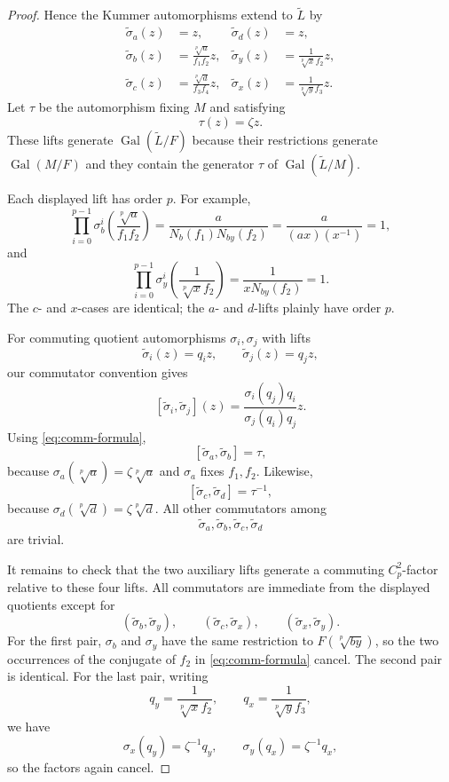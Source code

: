 \documentclass[12pt]{amsart}
\theoremstyle{definition}
\theoremstyle{remark}
\DeclareMathOperator{\Gal}{Gal}
\begin{document}
\begin{proof}
Hence the Kummer automorphisms extend to $\widetilde L$ by
\begin{align*}
 \widetilde\sigma_a(z)&=z,
 &\widetilde\sigma_d(z)&=z,\\
 \widetilde\sigma_b(z)&=\frac{\sqrt[p]{a}}{f_1f_2}z,
 &\widetilde\sigma_y(z)&=\frac{1}{\sqrt[p]{x}f_2}z,\\
 \widetilde\sigma_c(z)&=\frac{\sqrt[p]{d}}{f_3f_4}z,
 &\widetilde\sigma_x(z)&=\frac{1}{\sqrt[p]{y}f_3}z.
\end{align*}
Let $\tau$ be the automorphism fixing $M$ and satisfying
\[
 \tau(z)=\zeta z.
\]
These lifts generate $\Gal(\widetilde L/F)$ because their restrictions
generate $\Gal(M/F)$ and they contain the generator $\tau$ of
$\Gal(\widetilde L/M)$.

Each displayed lift has order $p$. For example,
\[
 \prod_{i=0}^{p-1}\sigma_b^i
 \left(\frac{\sqrt[p]{a}}{f_1f_2}\right)
 =\frac{a}{N_b(f_1)N_{by}(f_2)}
 =\frac{a}{(ax)(x^{-1})}=1,
\]
and
\[
 \prod_{i=0}^{p-1}\sigma_y^i
 \left(\frac{1}{\sqrt[p]{x}f_2}\right)
 =\frac{1}{xN_{by}(f_2)}=1.
\]
The $c$- and $x$-cases are identical; the $a$- and $d$-lifts plainly have
order $p$.

For commuting quotient automorphisms $\sigma_i,\sigma_j$ with lifts
\[
 \widetilde\sigma_i(z)=q_i z,
 \qquad
 \widetilde\sigma_j(z)=q_j z,
\]
our commutator convention gives
\begin{equation}\label{eq:comm-formula}
 [\widetilde\sigma_i,\widetilde\sigma_j](z)
 =\frac{\sigma_i(q_j)q_i}{\sigma_j(q_i)q_j}z.
\end{equation}
Using \eqref{eq:comm-formula},
\[
 [\widetilde\sigma_a,\widetilde\sigma_b]=\tau,
\]
because $\sigma_a(\sqrt[p]{a})=\zeta\sqrt[p]{a}$ and $\sigma_a$ fixes
$f_1,f_2$. Likewise,
\[
 [\widetilde\sigma_c,\widetilde\sigma_d]=\tau^{-1},
\]
because $\sigma_d(\sqrt[p]{d})=\zeta\sqrt[p]{d}$.
All other commutators among
\[
 \widetilde\sigma_a,\widetilde\sigma_b,
 \widetilde\sigma_c,\widetilde\sigma_d
\]
are trivial.

It remains to check that the two auxiliary lifts generate a commuting
$C_p^2$-factor relative to these four lifts. All commutators are immediate
from the displayed quotients except for
\[
 (\widetilde\sigma_b,\widetilde\sigma_y),\qquad
 (\widetilde\sigma_c,\widetilde\sigma_x),\qquad
 (\widetilde\sigma_x,\widetilde\sigma_y).
\]
For the first pair, $\sigma_b$ and $\sigma_y$ have the same restriction to
$F(\sqrt[p]{by})$, so the two occurrences of the conjugate of $f_2$ in
\eqref{eq:comm-formula} cancel. The second pair is identical. For the last
pair, writing
\[
 q_y=\frac{1}{\sqrt[p]{x}f_2},
 \qquad
 q_x=\frac{1}{\sqrt[p]{y}f_3},
\]
we have
\[
 \sigma_x(q_y)=\zeta^{-1}q_y,
 \qquad
 \sigma_y(q_x)=\zeta^{-1}q_x,
\]
so the factors again cancel.


\end{proof}
\end{document}
